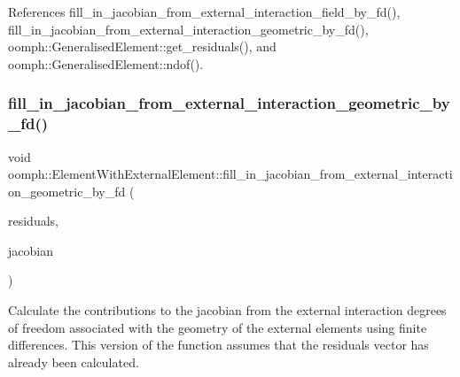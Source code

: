 References fill\+\_\+in\+\_\+jacobian\+\_\+from\+\_\+external\+\_\+interaction\+\_\+field\+\_\+by\+\_\+fd(), fill\+\_\+in\+\_\+jacobian\+\_\+from\+\_\+external\+\_\+interaction\+\_\+geometric\+\_\+by\+\_\+fd(), oomph\+::\+Generalised\+Element\+::get\+\_\+residuals(), and oomph\+::\+Generalised\+Element\+::ndof().

\mbox{\label{classoomph_1_1ElementWithExternalElement_ac0bd87a3f4ec8e87acb0fb450fa7e892}} 
\subsubsection{\texorpdfstring{fill\+\_\+in\+\_\+jacobian\+\_\+from\+\_\+external\+\_\+interaction\+\_\+geometric\+\_\+by\+\_\+fd()}{fill\_in\_jacobian\_from\_external\_interaction\_geometric\_by\_fd()}\hspace{0.1cm}{\footnotesize\ttfamily [1/2]}}
{\footnotesize\ttfamily void oomph\+::\+Element\+With\+External\+Element\+::fill\+\_\+in\+\_\+jacobian\+\_\+from\+\_\+external\+\_\+interaction\+\_\+geometric\+\_\+by\+\_\+fd (\begin{DoxyParamCaption}\item[{\hyperlink{classoomph_1_1Vector}{Vector}$<$ double $>$ \&}]{residuals,  }\item[{\hyperlink{classoomph_1_1DenseMatrix}{Dense\+Matrix}$<$ double $>$ \&}]{jacobian }\end{DoxyParamCaption})\hspace{0.3cm}{\ttfamily [protected]}}



Calculate the contributions to the jacobian from the external interaction degrees of freedom associated with the geometry of the external elements using finite differences. This version of the function assumes that the residuals vector has already been calculated. 

